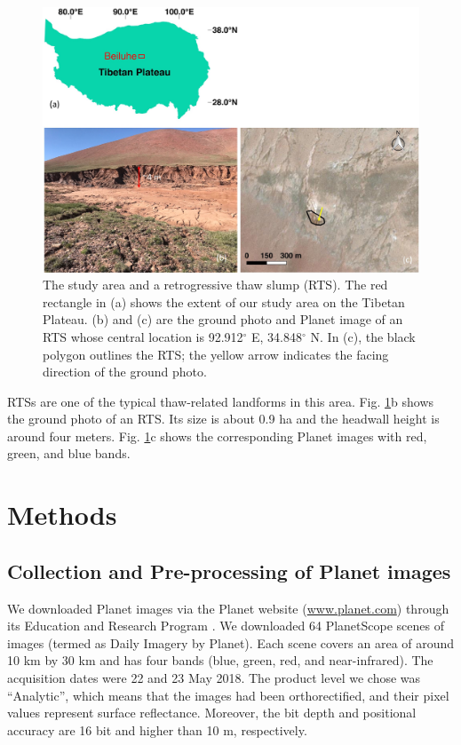 \documentclass[authoryear,preprint,review,12pt]{elsarticle}
\begin{document}
\begin{figure}
	\centering
	\includegraphics[width=14cm]{figures/study_area_loc_RTS_photo_v2_trim.jpg}
	\caption{The study area and a retrogressive thaw slump (RTS). The red rectangle in (a) shows the extent of our study area on the Tibetan Plateau. (b) and (c) are the ground photo and Planet image of an RTS whose central location is 92.912$^\circ$ E, 34.848$^\circ$ N. In (c), the black polygon outlines the RTS; the yellow arrow indicates the facing direction of the ground photo.}
	\label{fig_rts_groundphoto}
\end{figure}

RTSs are one of the typical thaw-related landforms in this area. Fig. \ref{fig_rts_groundphoto}b shows the ground photo of an RTS. Its size is about 0.9 ha and the headwall height is around four meters. Fig. \ref{fig_rts_groundphoto}c shows the corresponding Planet images with red, green, and blue bands. 

\section{Methods}
\label{sec_meth}

\subsection{Collection and Pre-processing of Planet images}
\label{subsec_collect_images}

We downloaded Planet images via the Planet website (\url{www.planet.com}) through its Education and Research Program \citep{team2017planet}. We downloaded 64 PlanetScope scenes of images (termed as Daily Imagery by Planet). Each scene covers an area of around 10 km by 30 km and has four bands (blue, green, red, and near-infrared). The acquisition dates were 22 and 23 May 2018. The product level we chose was ``Analytic'', which means that the images had been orthorectified, and their pixel values represent surface reflectance. Moreover, the bit depth and positional accuracy are 16 bit and higher than 10 m, respectively. %
\end{document}
